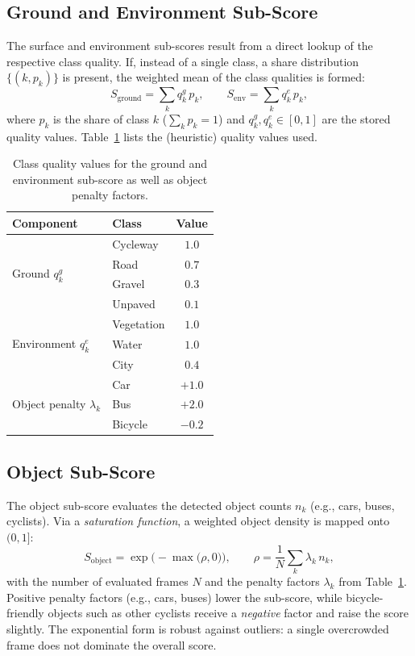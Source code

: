 \documentclass[letterpaper,journal]{IEEEtran}
\begin{document}
\subsection{Ground and Environment Sub-Score}
The surface and environment sub-scores result from a direct lookup of
the respective class quality. If, instead of a single class, a share
distribution $\{(k, p_k)\}$ is present, the weighted mean of the class
qualities is formed:
\begin{equation}
\label{eq:sub_lookup}
S_{\text{ground}} = \sum_{k} q^{g}_{k}\, p_{k},
\qquad
S_{\text{env}} = \sum_{k} q^{e}_{k}\, p_{k},
\end{equation}
where $p_k$ is the share of class $k$ ($\sum_k p_k = 1$) and
$q^{g}_{k}, q^{e}_{k} \in [0,1]$ are the stored quality values.
Table~\ref{tab:quality} lists the (heuristic) quality values used.

\begin{table}[!b]
\caption{Class quality values for the ground and environment sub-score
as well as object penalty factors.}
\label{tab:quality}
\centering
\begin{tabular}{@{}llc@{}}
\toprule
\textbf{Component} & \textbf{Class} & \textbf{Value}\\
\midrule
\multirow{4}{*}{Ground $q^{g}_{k}$}
  & Cycleway & $1.0$\\
  & Road     & $0.7$\\
  & Gravel   & $0.3$\\
  & Unpaved  & $0.1$\\
\midrule
\multirow{3}{*}{Environment $q^{e}_{k}$}
  & Vegetation & $1.0$\\
  & Water      & $1.0$\\
  & City       & $0.4$\\
\midrule
\multirow{3}{*}{Object penalty $\lambda_k$}
  & Car     & $+1.0$\\
  & Bus     & $+2.0$\\
  & Bicycle & $-0.2$\\
\bottomrule
\end{tabular}
\end{table}

\subsection{Object Sub-Score}
The object sub-score evaluates the detected object counts $n_k$
(e.g., cars, buses, cyclists). Via a \emph{saturation function}, a
weighted object density is mapped onto $(0, 1]$:
\begin{equation}
\label{eq:sub_object}
S_{\text{object}} = \exp\!\Big( -\max\big(\rho, 0\big) \Big),
\qquad
\rho = \frac{1}{N}\sum_{k} \lambda_k\, n_k,
\end{equation}
with the number of evaluated frames $N$ and the penalty factors
$\lambda_k$ from Table~\ref{tab:quality}. Positive penalty factors
(e.g., cars, buses) lower the sub-score, while bicycle-friendly objects
such as other cyclists receive a \emph{negative} factor and raise the
score slightly. The exponential form is robust against outliers: a
single overcrowded frame does not dominate the overall score.
\end{document}
